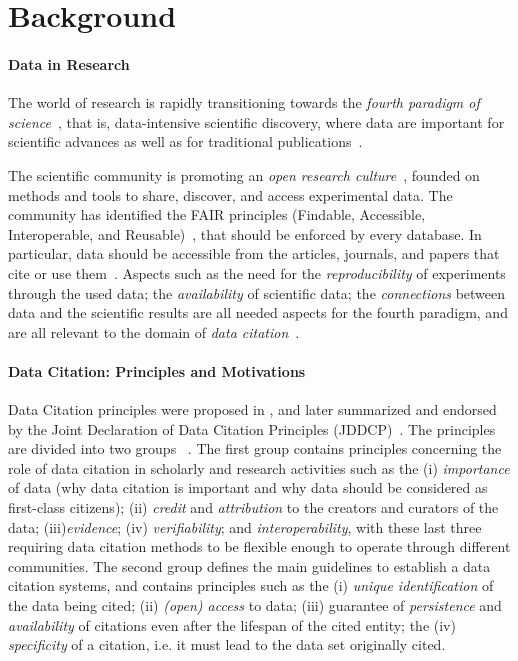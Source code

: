 \documentclass[preprint,12pt,sort&compress]{elsarticle}
\begin{document}

\section{Background}
\label{sec:related}

\paragraph{Data in Research} %
The world of research is rapidly transitioning towards the \emph{fourth paradigm of science}~\citep{hey2009jim}, that is, data-intensive scientific discovery, where data are important for scientific advances as well as for traditional publications~\citep{Bechhofer2013linkisnotenough}.

The scientific community is promoting an \emph{open research culture}~\citep{nosek2015promoting}, founded on methods and tools to share, discover, and access experimental data. 
The community has identified the FAIR principles (Findable, Accessible, Interoperable, and Reusable)~\citep{fair2016Wilikinson}, that should be enforced by every database. 
In particular, data should be accessible from the articles, journals, and papers that cite or use them~\citep{cousijn2019bringing}.
Aspects such as the need for the \emph{reproducibility} of experiments through the used data; the \emph{availability} of scientific data; the \emph{connections} between data and the scientific results are all needed aspects for the fourth paradigm, and are all relevant to the domain of \emph{data citation}~\citep{honor2016data}.

\paragraph{Data Citation: Principles and Motivations} Data Citation principles were proposed in \citep{CODATA2013}, and later summarized and endorsed by the Joint Declaration of Data Citation Principles (JDDCP)~\citep{martone2014joint}. 
The principles are divided into two groups~ \citep{Silvello18jasist}. The first group contains principles concerning the role of data citation in scholarly and research activities such as the (i) \emph{importance} of data (why data citation is important and why data should be considered as first-class citizens); (ii) \emph{credit} and \emph{attribution} to the creators and curators of the data; (iii)\emph{evidence}; (iv) \emph{verifiability}; and \emph{interoperability}, with these last three requiring data citation methods to be flexible enough to operate through different communities. 
The second group defines the main guidelines to establish a data citation systems, and contains principles such as the (i) \emph{unique identification} of the data being cited; (ii) \emph{(open) access} to data; (iii) guarantee of \emph{persistence} and \emph{availability} of citations even after the lifespan of the cited entity; the (iv) \emph{specificity} of a citation, i.e. it must lead to the data set originally cited. 
\end{document}
